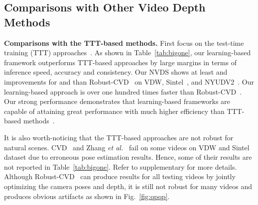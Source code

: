 \documentclass[10pt,twocolumn,letterpaper]{article}
\def\fw{neural video depth stabilizer}
\def\sx{NVDS}
\def\data{VDW}
\def\reffig{Fig.}
\def\reftab{Table}
\begin{document}
\begin{table}
\begin{center}
\end{center}
\vspace{-12pt}
\caption{
\textbf{Comparisons of the learning-based approaches on NYUDV2~\cite{nyu} dataset}.
All the compared methods use NYUDV2~\cite{nyu} as the training and evaluation data. Our \fw{} trained from scratch also achieves better performance than all the other methods.}
\label{tab:nyu}
\end{table}




\subsection{Comparisons with Other Video Depth Methods}

\noindent \textbf{Comparisons with the TTT-based methods.}
First focus on the test-time training (TTT) approaches~\cite{CVD,rcvd,dycvd}. As shown in \reftab{}~\ref{tab:bigone}, our learning-based framework outperforms TTT-based approaches by large margins in terms of inference speed, accuracy and consistency. Our \sx{} shows at least  and  improvements for  and  than Robust-CVD~\cite{rcvd} on \data{}, Sintel~\cite{sintel}, and NYUDV2~\cite{nyu}. Our learning-based approach is over one hundred times faster than Robust-CVD~\cite{rcvd}. Our strong performance demonstrates that learning-based frameworks are capable of attaining great performance with much higher efficiency than TTT-based methods~\cite{CVD,rcvd,dycvd}.

It is also worth-noticing that the TTT-based approaches are not robust for natural scenes. CVD~\cite{CVD} and Zhang \textit{et al.}~\cite{dycvd} fail on some videos on \data{} and Sintel~\cite{sintel} dataset due to erroneous pose estimation results. Hence, some of their results are not reported in \reftab{}~\ref{tab:bigone}. Refer to supplementary for more details. Although Robust-CVD~\cite{rcvd} can produce results for all testing videos by jointly optimizing the camera poses and depth, it is still not robust for many videos and produces obvious artifacts as shown in \reffig{}~\ref{fig:qpqp}.
\end{document}
